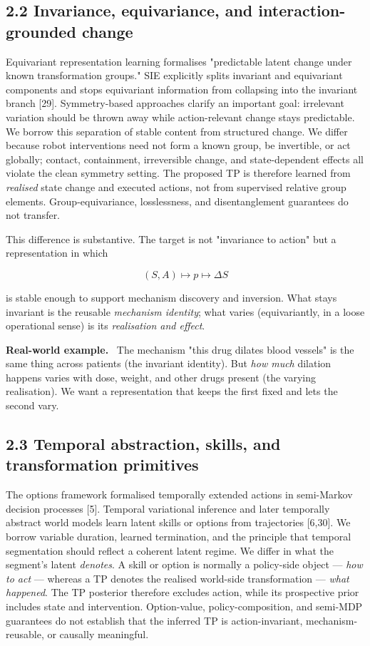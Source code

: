 \documentclass[11pt]{article}
\newenvironment{example}{%
  \par\smallskip\noindent\begin{minipage}{\textwidth}%
  \color{teal!60!black}\small
  \textbf{\color{teal!70!black}Real-world example.}\
}{%
  \end{minipage}\par\smallskip}
\begin{document}
\subsection*{2.2 Invariance, equivariance, and interaction-grounded change}

Equivariant representation learning formalises "predictable latent change under known transformation groups." SIE explicitly
splits invariant and equivariant components and stops equivariant information from collapsing into the invariant branch [29].
Symmetry-based approaches clarify an important goal: irrelevant variation should be thrown away while action-relevant change stays
predictable. We borrow this separation of stable content from structured change. We differ because robot interventions need not
form a known group, be invertible, or act globally; contact, containment, irreversible change, and state-dependent effects all
violate the clean symmetry setting. The proposed TP is therefore learned from \emph{realised} state change and executed actions,
not from supervised relative group elements. Group-equivariance, losslessness, and disentanglement guarantees do not transfer.

This difference is substantive. The target is not "invariance to action" but a representation in which

\[
\boxed{(S,A)\mapsto p\mapsto \Delta S}
\]

is stable enough to support mechanism discovery and inversion. What stays invariant is the reusable \emph{mechanism identity};
what varies (equivariantly, in a loose operational sense) is its \emph{realisation and effect}.

\begin{example}
The mechanism "this drug dilates blood vessels" is the same thing across patients (the invariant identity). But \emph{how much}
dilation happens varies with dose, weight, and other drugs present (the varying realisation). We want a representation that keeps
the first fixed and lets the second vary.
\end{example}

\subsection*{2.3 Temporal abstraction, skills, and transformation primitives}

The options framework formalised temporally extended actions in semi-Markov decision processes [5]. Temporal variational
inference and later temporally abstract world models learn latent skills or options from trajectories [6,30]. We borrow variable
duration, learned termination, and the principle that temporal segmentation should reflect a coherent latent regime. We differ in
what the segment's latent \emph{denotes}. A skill or option is normally a policy-side object --- \emph{how to act} --- whereas a TP
denotes the realised world-side transformation --- \emph{what happened}. The TP posterior therefore excludes action, while its
prospective prior includes state and intervention. Option-value, policy-composition, and semi-MDP guarantees do not establish that
the inferred TP is action-invariant, mechanism-reusable, or causally meaningful.
\end{document}
